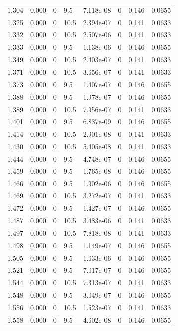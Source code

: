 \documentclass[preview]{standalone}
\begin{document}
{{{{{\begin{tabular}{L{1.2cm}C{1.2cm} C{0.3cm}C{0.5cm} C{1.4cm}C{1.4cm} C{1.4cm}C{1.4cm}}
  1.304  &  0.000  & 0     & 9.5 &  7.118e-08  & 0  & 0.146 &  0.0655   \\ 
  1.325  &  0.000  & 0     & 10.5 &  2.394e-07  & 0  & 0.141 &  0.0633   \\ 
  1.332  &  0.000  & 0     & 10.5 &  2.507e-06  & 0  & 0.141 &  0.0633   \\ 
  1.333  &  0.000  & 0     & 9.5 &  1.138e-06  & 0  & 0.146 &  0.0655   \\ 
  1.349  &  0.000  & 0     & 10.5 &  2.403e-07  & 0  & 0.141 &  0.0633   \\ 
  1.371  &  0.000  & 0     & 10.5 &  3.656e-07  & 0  & 0.141 &  0.0633   \\ 
  1.373  &  0.000  & 0     & 9.5 &  1.407e-07  & 0  & 0.146 &  0.0655   \\ 
  1.388  &  0.000  & 0     & 9.5 &  1.978e-07  & 0  & 0.146 &  0.0655   \\ 
  1.389  &  0.000  & 0     & 10.5 &  7.956e-07  & 0  & 0.141 &  0.0633   \\ 
  1.401  &  0.000  & 0     & 9.5 &  6.837e-09  & 0  & 0.146 &  0.0655   \\ 
  1.414  &  0.000  & 0     & 10.5 &  2.901e-08  & 0  & 0.141 &  0.0633   \\ 
  1.430  &  0.000  & 0     & 10.5 &  5.405e-08  & 0  & 0.141 &  0.0633   \\ 
  1.444  &  0.000  & 0     & 9.5 &  4.748e-07  & 0  & 0.146 &  0.0655   \\ 
  1.459  &  0.000  & 0     & 9.5 &  1.765e-08  & 0  & 0.146 &  0.0655   \\ 
  1.466  &  0.000  & 0     & 9.5 &  1.902e-06  & 0  & 0.146 &  0.0655   \\ 
  1.469  &  0.000  & 0     & 10.5 &  3.272e-07  & 0  & 0.141 &  0.0633   \\ 
  1.472  &  0.000  & 0     & 9.5 &  1.427e-07  & 0  & 0.146 &  0.0655   \\ 
  1.487  &  0.000  & 0     & 10.5 &  3.483e-06  & 0  & 0.141 &  0.0633   \\ 
  1.497  &  0.000  & 0     & 10.5 &  7.818e-08  & 0  & 0.141 &  0.0633   \\ 
  1.498  &  0.000  & 0     & 9.5 &  1.149e-07  & 0  & 0.146 &  0.0655   \\ 
  1.505  &  0.000  & 0     & 9.5 &  1.633e-06  & 0  & 0.146 &  0.0655   \\ 
  1.521  &  0.000  & 0     & 9.5 &  7.017e-07  & 0  & 0.146 &  0.0655   \\ 
  1.544  &  0.000  & 0     & 10.5 &  7.313e-07  & 0  & 0.141 &  0.0633   \\ 
  1.548  &  0.000  & 0     & 9.5 &  3.049e-07  & 0  & 0.146 &  0.0655   \\ 
  1.556  &  0.000  & 0     & 10.5 &  1.523e-07  & 0  & 0.141 &  0.0633   \\ 
  1.558  &  0.000  & 0     & 9.5 &  4.602e-08  & 0  & 0.146 &  0.0655   \\ 
\hline 
\end{tabular} 

}}}}}
\end{document}
